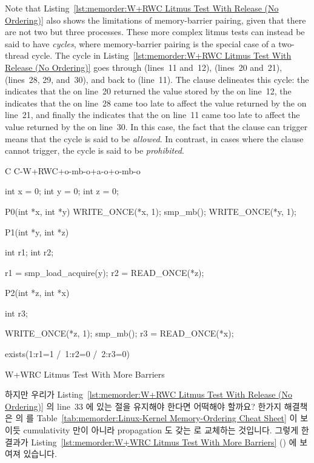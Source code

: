 Note that
Listing~\ref{lst:memorder:W+RWC Litmus Test With Release (No Ordering)}
also shows the limitations of memory-barrier pairing, given that
there are not two but three processes.
These more complex litmus tests can instead be said to have \emph{cycles},
where memory-barrier pairing is the special case of a two-thread cycle.
The cycle in
Listing~\ref{lst:memorder:W+RWC Litmus Test With Release (No Ordering)}
goes through  (lines~11 and~12),  (lines~20 and~21),
 (lines~28, 29, and~30), and back to  (line~11).
The  clause delineates this cycle:
the  indicates that the  on line~20
returned the value stored by the  on line~12,
the  indicates that the  on line~28 came
too late to affect the value returned by the  on line~21,
and finally the  indicates that the
 on line~11 came too late to affect the value returned
by the  on line~30.
In this case, the fact that the  clause can trigger means that
the cycle is said to be \emph{allowed}.
In contrast, in cases where the  clause cannot trigger,
the cycle is said to be \emph{prohibited}.
\fi

\begin{listing}[tbp]
{ \scriptsize
\begin{verbbox}[\LstLineNo]
C C-W+RWC+o-mb-o+a-o+o-mb-o

{
int x = 0;
int y = 0;
int z = 0;
}

P0(int *x, int *y)
{
  WRITE_ONCE(*x, 1);
  smp_mb();
  WRITE_ONCE(*y, 1);
}

P1(int *y, int *z)
{
  int r1;
  int r2;

  r1 = smp_load_acquire(y);
  r2 = READ_ONCE(*z);
}

P2(int *z, int *x)
{
  int r3;

  WRITE_ONCE(*z, 1);
  smp_mb();
  r3 = READ_ONCE(*x);
}

exists(1:r1=1 /\ 1:r2=0 /\ 2:r3=0)
\end{verbbox}
}
\centering
\theverbbox
\caption{W+WRC Litmus Test With More Barriers}
\label{lst:memorder:W+WRC Litmus Test With More Barriers}
\end{listing}

하지만 우리가
Listing~\ref{lst:memorder:W+RWC Litmus Test With Release (No Ordering)}
의 line~33 에 있는  절을 유지해야 한다면 어떡해야 할까요?
한가지 해결책은  의  를
Table~\ref{tab:memorder:Linux-Kernel Memory-Ordering Cheat Sheet}
이 보이듯 cumulativity 만이 아니라 propagation 도 갖는
 로 교체하는 것입니다.
그렇게 한 결과가
Listing~\ref{lst:memorder:W+WRC Litmus Test With More Barriers}
()
에 보여져 있습니다.
\iffalse

